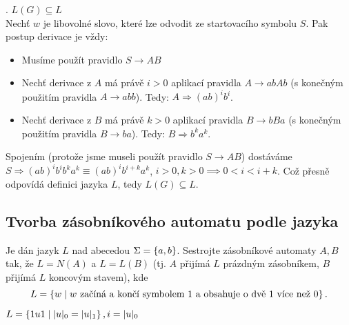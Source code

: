 . $L(G) \subseteq L$\\
Nechť $w$ je libovolné slovo, které lze odvodit ze startovacího symbolu $S$. Pak postup derivace je vždy:
\begin{itemize}
    \item Musíme použít pravidlo $S \rightarrow AB$
    \item Nechť derivace z $A$ má právě $i > 0$ aplikací pravidla $A \rightarrow abAb$ (s konečným použitím pravidla 
    $A \rightarrow abb$). Tedy: $A \Rightarrow (ab)^i b^i$.
    \item Nechť derivace z $B$ má právě $k > 0$ aplikací pravidla $B \rightarrow bBa$ (s konečným použitím pravidla
    $B \rightarrow ba$). Tedy: $B \Rightarrow b^k a^k$.
\end{itemize}
Spojením (protože jsme museli použít pravidlo $S \rightarrow AB$) dostáváme $S \Rightarrow (ab)^i b^i b^k a^k \equiv 
(ab)^i b^{i+k} a^k$, $i > 0, k > 0 \implies 0 < i < i+k$. Což přesně odpovídá definici jazyka $L$, tedy $L(G) \subseteq L$.

\subsection{Tvorba zásobníkového automatu podle jazyka}
Je dán jazyk $L$ nad abecedou $\Sigma = \left\lbrace a,b \right\rbrace$. Sestrojte zásobníkové automaty $A,B$ tak, že $L = N(A)$ a $L = L(B)$ 
(tj. $A$ přijímá $L$ prázdným zásobníkem, $B$ přijímá $L$ koncovým stavem), kde
\[L = \left\lbrace w \mid w \text{ začíná a končí symbolem } 1 \text{ a obsahuje o dvě } 1 \text{ více než } 0 \right\rbrace\text{.}\]

$L = \left\lbrace 1u1 \mid |u|_0 = |u|_1 \right\rbrace, i = |u|_0$


